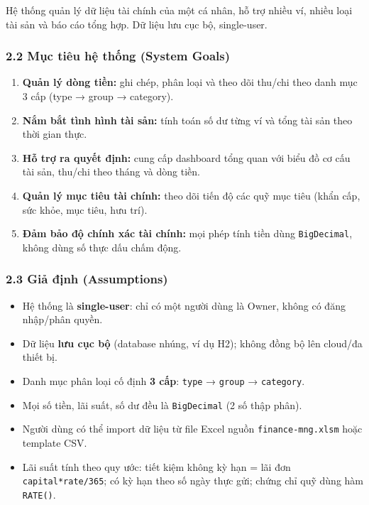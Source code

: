 \documentclass[11pt,a4paper]{article}
\providecommand{\tightlist}{%
  \setlength{\itemsep}{0pt}\setlength{\parskip}{0pt}}
\begin{document}
Hệ thống quản lý dữ liệu tài chính của một cá nhân, hỗ trợ nhiều ví,
nhiều loại tài sản và báo cáo tổng hợp. Dữ liệu lưu cục bộ, single-user.

\subsubsection{2.2 Mục tiêu hệ thống (System Goals)}\label{mux1ee5c-tiuxeau-hux1ec7-thux1ed1ng-system-goals}

\begin{enumerate}
\def\labelenumi{\arabic{enumi}.}
\tightlist
\item
  \textbf{Quản lý dòng tiền:} ghi chép, phân loại và theo dõi thu/chi
  theo danh mục 3 cấp (type → group → category).
\item
  \textbf{Nắm bắt tình hình tài sản:} tính toán số dư từng ví và tổng
  tài sản theo thời gian thực.
\item
  \textbf{Hỗ trợ ra quyết định:} cung cấp dashboard tổng quan với biểu
  đồ cơ cấu tài sản, thu/chi theo tháng và dòng tiền.
\item
  \textbf{Quản lý mục tiêu tài chính:} theo dõi tiến độ các quỹ mục tiêu
  (khẩn cấp, sức khỏe, mục tiêu, hưu trí).
\item
  \textbf{Đảm bảo độ chính xác tài chính:} mọi phép tính tiền dùng
  \texttt{BigDecimal}, không dùng số thực dấu chấm động.
\end{enumerate}

\subsubsection{2.3 Giả định (Assumptions)}\label{giux1ea3-ux111ux1ecbnh-assumptions}

\begin{itemize}
\tightlist
\item
  Hệ thống là \textbf{single-user}: chỉ có một người dùng là Owner,
  không có đăng nhập/phân quyền.
\item
  Dữ liệu \textbf{lưu cục bộ} (database nhúng, ví dụ H2); không
  đồng bộ lên cloud/đa thiết bị.
\item
  Danh mục phân loại cố định \textbf{3 cấp}: \texttt{type} →
  \texttt{group} → \texttt{category}.
\item
  Mọi số tiền, lãi suất, số dư đều là \texttt{BigDecimal} (2 số thập
  phân).
\item
  Người dùng có thể import dữ liệu từ file Excel nguồn
  \texttt{finance-mng.xlsm} hoặc template CSV.
\item
  Lãi suất tính theo quy ước: tiết kiệm không kỳ hạn = lãi đơn
  \texttt{capital*rate/365}; có kỳ hạn theo số ngày thực gửi; chứng chỉ
  quỹ dùng hàm \texttt{RATE()}.
\end{itemize}
\end{document}
